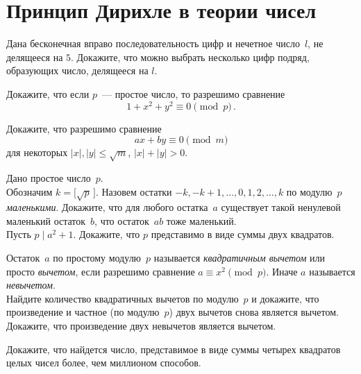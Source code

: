 
\section*{Принцип Дирихле в теории чисел}


\begingroup
    \def\divides{\mathrel{\vert}}

\begin{problems}

\item
Дана бесконечная вправо последовательность цифр и нечетное число~$l$,
не делящееся на $5$.
Докажите, что можно выбрать несколько цифр подряд, образующих число, делящееся
на $l$.

\item
Докажите, что если $p$~--- простое число, то разрешимо сравнение
\[
    1 + x^2 + y^2 \equiv 0 \pmod{p}
\, . \]

\item
Докажите, что разрешимо сравнение
\[
    a x + b y \equiv 0 \pmod{m}
\]
для некоторых $\lvert x \rvert, \lvert y \rvert \leq \sqrt{m}$,
$\lvert x \rvert + \lvert y \rvert > 0$.

\item
Дано простое число~$p$.
\\
\subproblem
Обозначим $k = \bigl[ \sqrt{p} \, \bigr]$.
Назовем остатки $- k, - k + 1, \ldots, 0, 1, 2, \ldots, k$ по модулю~$p$
\emph{маленькими}.
Докажите, что для любого остатка~$a$ существует такой ненулевой маленький
остаток~$b$, что остаток~$a b$ тоже маленький.
\\
\subproblem
Пусть $p \divides a^2 + 1$.
Докажите, что $p$ представимо в виде суммы двух квадратов.


\item
Остаток~$a$ по простому модулю~$p$ называется \emph{квадратичным вычетом} или
просто \emph{вычетом}, если разрешимо сравнение $a \equiv x^2 \pmod{p}$.
Иначе $a$ называется \emph{невычетом}.
\\
\subproblem
Найдите количество квадратичных вычетов по модулю~$p$ и докажите, что
произведение и частное (по модулю~$p$) двух вычетов снова является вычетом.
\\
\subproblem
Докажите, что произведение двух невычетов является вычетом.

\item
Докажите, что найдется число, представимое в виде суммы четырех квадратов целых
чисел более, чем миллионом способов.

\end{problems}

\endgroup %

